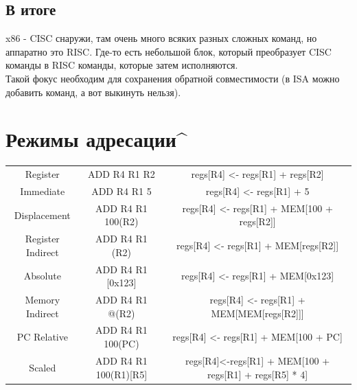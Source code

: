 \documentclass[12pt, a4paper]{article}
\begin{document}
\subsection{В итоге}
x86 - CISC снаружи, там очень много всяких разных сложных команд, но аппаратно это RISC. Где-то есть небольшой блок, который преобразует CISC команды в RISC команды, которые затем исполняются.\\
Такой фокус необходим для сохранения обратной совместимости (в ISA можно добавить команд, а вот выкинуть нельзя).
\section{Режимы адресации\textasciicircum}
\begin{table}[h]
\begin{tabular}[width=\linewidth]{|c|c|c|}
     Register & ADD R4 R1 R2 & regs[R4] <- regs[R1] + regs[R2] \\
     Immediate & ADD R4 R1 5 & regs[R4] <- regs[R1] + 5\\
     Displacement & ADD R4 R1 100(R2) & regs[R4] <- regs[R1] + MEM[100 + regs[R2]]\\
     Register Indirect & ADD R4 R1 (R2) & regs[R4] <- regs[R1] + MEM[regs[R2]]\\
     Absolute & ADD R4 R1 [0x123] & regs[R4] <- regs[R1] + MEM[0x123]\\
     Memory Indirect & ADD R4 R1 @(R2) & regs[R4] <- regs[R1] + MEM[MEM[regs[R2]]]\\
     PC Relative & ADD R4 R1 100(PC) & regs[R4] <- regs[R1] + MEM[100 + PC]\\
     Scaled & ADD R4 R1 100(R1)[R5] & regs[R4]<-regs[R1] + MEM[100 + regs[R1] + regs[R5] * 4]
\end{tabular}
\end{table}
\end{document}
